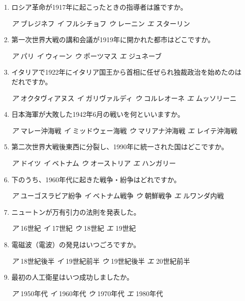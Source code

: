 \documentclass[dvipdfmx,uplatex]{bxjsarticle}
\newcommand{\sentakusi}[4]{
\hspace{.3zw}
\emph{ア}\hspace{1zw} #1 \hspace{2zw} \emph{イ} \hspace{1zw}#2 \hspace{2zw}\emph{ウ}\hspace{1zw} #3 \hspace{2zw}\emph{エ}\hspace{1zw} #4

}
\begin{document}
\begin{enumerate}
\item ロシア革命が1917年に起こったときの指導者は誰ですか。

  \sentakusi{ブレジネフ}{フルシチョフ}{レーニン}{スターリン}


\item 第一次世界大戦の講和会議が1919年に開かれた都市はどこですか。

\sentakusi{パリ}{ウィーン}{ポーツマス}{ジュネーブ}





\item イタリアで1922年にイタリア国王から首相に任ぜられ独裁政治を始めたのはだれですか。

\sentakusi{オクタヴィアヌス}{ガリヴァルディ}{コルレオーネ}{ムッソリーニ}


\item 日本海軍が大敗した1942年6月の戦いを何といいますか。

  \sentakusi{マレー沖海戦}{ミッドウェー海戦}{マリアナ沖海戦}{レイテ沖海戦}

  
\item 第二次世界大戦後東西に分裂し、1990年に統一された国はどこですか。

  \sentakusi{ドイツ}{ベトナム}{オーストリア}{ハンガリー}


\item 下のうち、1960年代に起きた戦争・紛争はどれですか。

\sentakusi{ユーゴスラビア紛争}{ベトナム戦争}{朝鮮戦争}{ルワンダ内戦}

\item ニュートンが万有引力の法則を発表した。

\sentakusi{16世紀}{17世紀}{18世紀}{19世紀}

\item 電磁波（電波）の発見はいつごろですか。

\sentakusi{18世紀後半}{19世紀前半}{19世紀後半}{20世紀前半}




\item 最初の人工衛星はいつ成功しましたか。

\sentakusi{1950年代}{1960年代}{1970年代}{1980年代}

\end{enumerate}
%

%
\end{document}
